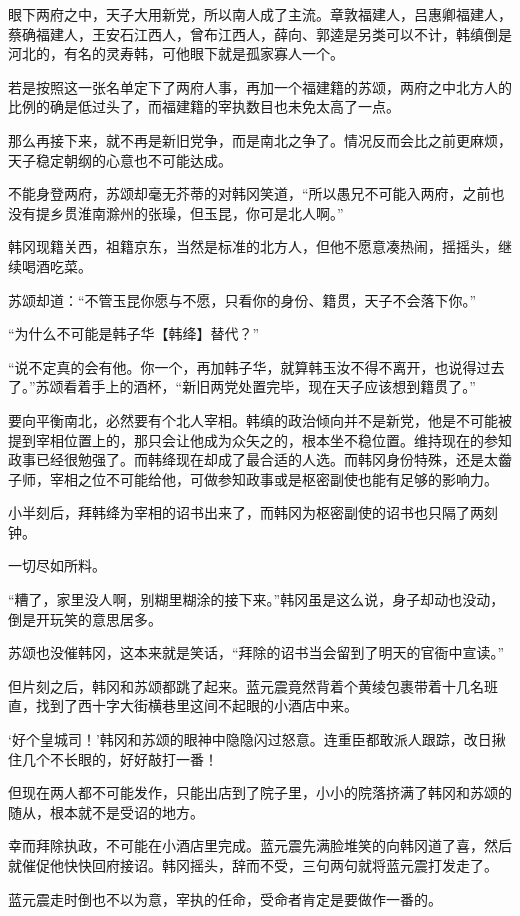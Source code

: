 眼下两府之中，天子大用新党，所以南人成了主流。章敦福建人，吕惠卿福建人，蔡确福建人，王安石江西人，曾布江西人，薛向、郭逵是另类可以不计，韩缜倒是河北的，有名的灵寿韩，可他眼下就是孤家寡人一个。

若是按照这一张名单定下了两府人事，再加一个福建籍的苏颂，两府之中北方人的比例的确是低过头了，而福建籍的宰执数目也未免太高了一点。

那么再接下来，就不再是新旧党争，而是南北之争了。情况反而会比之前更麻烦，天子稳定朝纲的心意也不可能达成。

不能身登两府，苏颂却毫无芥蒂的对韩冈笑道，“所以愚兄不可能入两府，之前也没有提乡贯淮南滁州的张璪，但玉昆，你可是北人啊。”

韩冈现籍关西，祖籍京东，当然是标准的北方人，但他不愿意凑热闹，摇摇头，继续喝酒吃菜。

苏颂却道：“不管玉昆你愿与不愿，只看你的身份、籍贯，天子不会落下你。”

“为什么不可能是韩子华【韩绛】替代？”

“说不定真的会有他。你一个，再加韩子华，就算韩玉汝不得不离开，也说得过去了。”苏颂看着手上的酒杯，“新旧两党处置完毕，现在天子应该想到籍贯了。”

要向平衡南北，必然要有个北人宰相。韩缜的政治倾向并不是新党，他是不可能被提到宰相位置上的，那只会让他成为众矢之的，根本坐不稳位置。维持现在的参知政事已经很勉强了。而韩绛现在却成了最合适的人选。而韩冈身份特殊，还是太齤子师，宰相之位不可能给他，可做参知政事或是枢密副使也能有足够的影响力。

小半刻后，拜韩绛为宰相的诏书出来了，而韩冈为枢密副使的诏书也只隔了两刻钟。

一切尽如所料。

“糟了，家里没人啊，别糊里糊涂的接下来。”韩冈虽是这么说，身子却动也没动，倒是开玩笑的意思居多。

苏颂也没催韩冈，这本来就是笑话，“拜除的诏书当会留到了明天的官衙中宣读。”

但片刻之后，韩冈和苏颂都跳了起来。蓝元震竟然背着个黄绫包裹带着十几名班直，找到了西十字大街横巷里这间不起眼的小酒店中来。

‘好个皇城司！’韩冈和苏颂的眼神中隐隐闪过怒意。连重臣都敢派人跟踪，改日揪住几个不长眼的，好好敲打一番！

但现在两人都不可能发作，只能出店到了院子里，小小的院落挤满了韩冈和苏颂的随从，根本就不是受诏的地方。

幸而拜除执政，不可能在小酒店里完成。蓝元震先满脸堆笑的向韩冈道了喜，然后就催促他快快回府接诏。韩冈摇头，辞而不受，三句两句就将蓝元震打发走了。

蓝元震走时倒也不以为意，宰执的任命，受命者肯定是要做作一番的。

